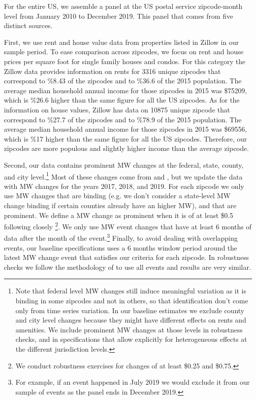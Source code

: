 For the entire US, we assemble a panel at the US postal service zipcode-month level from January 2010 to December 2019. This panel that comes from five distinct sources. 

First, we use rent and house value data from properties listed in Zillow \parencite{zillow} in our sample period. 
To ease comparison across zipcodes, we focus on rent and house prices per square foot for single family houses and condos. For this category the Zillow data provides information on rents for 3316 unique zipcodes that correspond to \%8.43 of the zipcodes and to \%36.6 of the 2015 population. The average median household annual income for those zipcodes in 2015 was \$75209, which is \%26.6 higher than the same figure for all the US zipcodes. As for the information on house values, Zillow has data on 10875 unique zipcode that correspond to \%27.7 of the zipcodes and to \%78.9 of the 2015 population. The average median household annual income for those zipcodes in 2015 was \$69556, which is \%17 higher than the same figure for all the US zipcodes. Therefore, our zipcodes are more populous and slightly higher income than the average zipcode. 

Second, our data contains prominent MW changes at the federal, state, county, and city level.\footnote{Note that federal level MW changes still induce meaningful variation as it is binding in some zipcodes and not in others, so that identification don't come only from time series variation. In our baseline estimates we exclude county and city level changes because they might have different effects on rents and amenities. We include prominent MW changes at those levels in robustness checks, and in specifications that allow explicitly for heterogeneous effects at the different jurisdiction levels.} Most of these changes come from \textcite{vaghul2016historical} and \textcite{cengiz2019effect}, but we update the data with MW changes for the years 2017, 2018, and 2019. For each zipcode we only use MW changes that are binding (e.g. we don't consider a state-level MW change binding if certain counties already have an higher MW), and that are prominent. We define a MW change as prominent when it is of at least \$0.5 following closely \textcite{cengiz2019effect}\footnote{We conduct robustness exercises for changes of at least \$0.25 and \$0.75.}. We only use MW event changes that have at least 6 months of data after the month of the event.\footnote{For example, if an event happened in July 2019 we would exclude it from our sample of events as the panel ends in December 2019.} Finally, to avoid dealing with overlapping events, our baseline specifications uses a 6 months window period around the latest MW change event that satisfies our criteria for each zipcode. In robustness checks we follow the methodology of \textcite{cengiz2019effect} to use all events and results are very similar.

